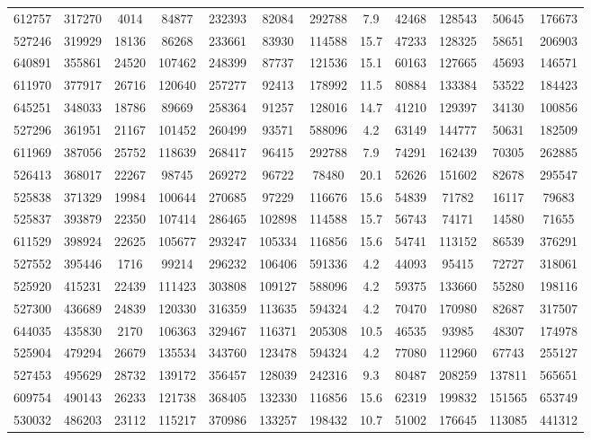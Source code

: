 \documentclass[DM,lsstdraft,toc,usenatbib]{lsstdoc}
\begin{document}
\begin{landscape}
\begin{longtable}{cccccccccccc}
612757 & 317270 & 4014 & 84877 & 232393 & 82084 & 292788 & 7.9 & 42468 & 128543 & 50645 & 176673 \\
527246 & 319929 & 18136 & 86268 & 233661 & 83930 & 114588 & 15.7 & 47233 & 128325 & 58651 & 206903 \\
640891 & 355861 & 24520 & 107462 & 248399 & 87737 & 121536 & 15.1 & 60163 & 127665 & 45693 & 146571 \\
611970 & 377917 & 26716 & 120640 & 257277 & 92413 & 178992 & 11.5 & 80884 & 133384 & 53522 & 184423 \\
645251 & 348033 & 18786 & 89669 & 258364 & 91257 & 128016 & 14.7 & 41210 & 129397 & 34130 & 100856 \\
527296 & 361951 & 21167 & 101452 & 260499 & 93571 & 588096 & 4.2 & 63149 & 144777 & 50631 & 182509 \\
611969 & 387056 & 25752 & 118639 & 268417 & 96415 & 292788 & 7.9 & 74291 & 162439 & 70305 & 262885 \\
526413 & 368017 & 22267 & 98745 & 269272 & 96722 & 78480 & 20.1 & 52626 & 151602 & 82678 & 295547 \\
525838 & 371329 & 19984 & 100644 & 270685 & 97229 & 116676 & 15.6 & 54839 & 71782 & 16117 & 79683 \\
525837 & 393879 & 22350 & 107414 & 286465 & 102898 & 114588 & 15.7 & 56743 & 74171 & 14580 & 71655 \\
611529 & 398924 & 22625 & 105677 & 293247 & 105334 & 116856 & 15.6 & 54741 & 113152 & 86539 & 376291 \\
527552 & 395446 & 1716 & 99214 & 296232 & 106406 & 591336 & 4.2 & 44093 & 95415 & 72727 & 318061 \\
525920 & 415231 & 22439 & 111423 & 303808 & 109127 & 588096 & 4.2 & 59375 & 133660 & 55280 & 198116 \\
527300 & 436689 & 24839 & 120330 & 316359 & 113635 & 594324 & 4.2 & 70470 & 170980 & 82687 & 317507 \\
644035 & 435830 & 2170 & 106363 & 329467 & 116371 & 205308 & 10.5 & 46535 & 93985 & 48307 & 174978 \\
525904 & 479294 & 26679 & 135534 & 343760 & 123478 & 594324 & 4.2 & 77080 & 112960 & 67743 & 255127 \\
527453 & 495629 & 28732 & 139172 & 356457 & 128039 & 242316 & 9.3 & 80487 & 208259 & 137811 & 565651 \\
609754 & 490143 & 26233 & 121738 & 368405 & 132330 & 116856 & 15.6 & 62319 & 199832 & 151565 & 653749 \\
530032 & 486203 & 23112 & 115217 & 370986 & 133257 & 198432 & 10.7 & 51002 & 176645 & 113085 & 441312 \\

\end{longtable}
\end{landscape}
\end{document}
